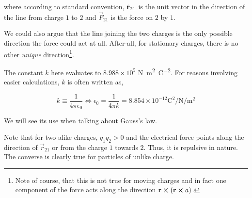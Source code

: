 where according to standard convention, \(\hat{\boldsymbol{\mathbf{r}}}_{21}\) is the unit vector 
in the direction of the line from charge \(1\) to \(2\) and \(\vec{F}_{21}\) is 
the force on \(2\) by \(1\).

We could also argue that the line joining the two charges is the only possible direction 
the force could act at all. After-all, for stationary charges, there is no other 
\emph{unique} direction\footnote{Note of course, that this is not true for 
moving charges and in fact one component of the force acts along the direction 
\(\vec{r} \cp (\vec{r} \cp a)\).}.

The constant \(k\) here evaluates to \(8.988 \times 10^5\) \unit{\newton\meter\squared\per\coulomb\squared}.
For reasons involving easier calculations, \(k\) is often written as,

\begin{equation}
    k \equiv \frac{1}{4\pi\epsilon_0} \iff \boxed{\epsilon_0 = \frac{1}{4\pi k} = 8.854 \times 10^{-12} \unit{\coulomb\squared\per\newton\per\meter\squared}}
\end{equation}

We will see its use when talking about Gauss's law.

Note that for two alike charges, \(q_1q_2 > 0\) and the electrical force points along the direction of 
\(\vec{r}_{21}\) or from the charge \(1\) towards \(2\). Thus, it is repulsive 
in nature. The converse is clearly true for particles of unlike charge.
